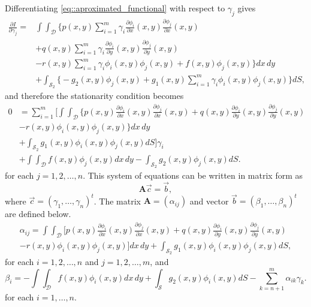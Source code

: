 \documentclass[a4paper]{article}
\begin{document}
Differentiating \ref{eq::aproximated_functional} with respect to $\gamma_j$ gives
\begin{equation}
\begin{aligned}
\frac{\partial I}{\partial \gamma_j}=&\int \int_{\mathcal{D}}\Bigg\{p(x,y)\sum_{i=1}^m \gamma_i\frac{\partial \phi_i}{\partial x}(x,y)\frac{\partial \phi_j}{\partial x}(x,y)\\
& + q(x,y)\sum_{i=1}^{m}\gamma_i\frac{\partial \phi_i}{\partial y}(x,y)\frac{\partial \phi_j}{\partial y}(x,y)\\
& - r(x,y)\sum_{i=1}^{m}\gamma_i \phi_i(x,y)\phi_j(x,y)+f(x,y)\phi_j(x,y)\Bigg\}dx\,dy\\
& + \int_{\mathcal{S}_2}\Bigg\{-g_2(x,y)\phi_j(x,y)+g_1(x,y)\sum_{i=1}^m \gamma_i \phi_i(x,y)\phi_j(x,y)\Bigg\}dS,
\end{aligned}
\end{equation}
and therefore the stationarity condition becomes
\begin{equation}
\begin{aligned}
0&=\sum_{i=1}^m \Bigg[\int \int_{\mathcal{D}}\Bigg\{ p(x,y)\frac{\partial \phi_i}{\partial x}(x,y)\frac{\partial \phi_j}{\partial x}(x,y)+ q(x,y)\frac{\partial \phi_i}{\partial y}(x,y)\frac{\partial \phi_j}{\partial y}(x,y)\\
&-r(x,y)\phi_i(x,y)\phi_j(x,y)\Bigg\}dx\,dy\\
&+ \int_{\mathcal{S}_2}g_1(x,y)\phi_i(x,y)\phi_j(x,y)dS\Bigg]\gamma_i\\
&+ \int\int_{\mathcal{D}} f(x,y)\phi_j(x,y)dx\,dy-\int_{\mathcal{S}_2} g_2(x,y)\phi_j(x,y)dS.
\end{aligned}
\end{equation}
for each $j=1,2,\hdots,n$. This system of equations can be written in matrix form as
\begin{equation}
\mathbf{A}\vec{c}=\vec{b},
\end{equation}
where $\vec{c}=(\gamma_1,\hdots,\gamma_n)^t$. The matrix $\mathbf{A}=(\alpha_{ij})$ and vector $\vec{b}=(\beta_1,\hdots,\beta_n)^t$ are defined below.
\begin{equation}\label{eq::alpha_ij}
\begin{aligned}
\alpha_{ij}=\int\int_{\mathcal{D}}\Bigg[ p(x,y)\frac{\partial \phi_i}{\partial x}(x,y)\frac{\partial \phi_j}{\partial x}(x,y)+ q(x,y)\frac{\partial \phi_i}{\partial y}(x,y)\frac{\partial \phi_j}{\partial y}(x,y)\\
-r(x,y)\phi_i(x,y)\phi_j(x,y)\Bigg] dx\,dy+\int_{\mathcal{S}_2} g_1(x,y)\phi_i(x,y)\phi_j(x,y)dS,
\end{aligned}
\end{equation}
for each $i=1,2,\hdots,n$ and $j=1,2,\hdots,m$, and
\begin{equation}\label{eq::beta_i}
\beta_i=-\int\int_{\mathcal{D}}f(x,y)\phi_i(x,y) dx\,dy+\int_{\mathcal{S}} g_2(x,y)\phi_i(x,y)dS-\sum_{k=n+1}^m\alpha_{ik}\gamma_k.
\end{equation}
for each $i=1,\hdots,n$.\\
\end{document}
